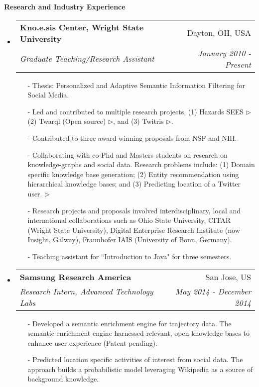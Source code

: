 \documentclass[letterpaper,9pt]{article}
\makeatletter
\newcommand{\resheading}[1]{{\large \colorbox{mygrey}{\begin{minipage}{\textwidth}{\textbf{#1 \vphantom{p\^{E}}}}\end{minipage}}}}
\newcommand{\ressubheading}[4]{
\begin{tabular*}{7.0in}{l@{\extracolsep{\fill}}r}
		\textbf{#1} & #2 \\
		\textit{#3} & \textit{#4} \\
\end{tabular*}\vspace{-6pt}}
\makeatother
\begin{document}
\resheading{Research and Industry Experience}
\begin{itemize}
\item
	\ressubheading{Kno.e.sis Center, Wright State University}{Dayton, OH, USA}{Graduate Teaching/Research Assistant}{January 2010 - Present}

\begin{itemize}

\item[-] Thesis: Personalized and Adaptive Semantic Information Filtering for Social Media. 
	
\item[-] Led and contributed to multiple research projects, (1) Hazards SEES \href{http://wiki.knoesis.org/index.php/Social_and_Physical_Sensing_
Enabled_Decision_Support}{$\triangleright$} (2) Twarql (Open source) \href{http://wiki.knoesis.org/index.php/Twarql}{$\triangleright$}, and (3) Twitris \href{http://twitris.knoesis.org}{$\triangleright$}. 

\item[-] \justify Contributed to three award winning proposals from NSF and NIH.

\item[-] \justify Collaborating with co-Phd and Masters students on research on  knowledge-graphs and social data. Research problems include: (1) Domain specific knowledge base generation; (2) Entity recommendation using hierarchical knowledge bases; and (3) Predicting location of a Twitter user.  \href{http://knoesis.org/library/resource.php?id=2039}{$\triangleright$}  

\item[-] \justify Research projects and proposals involved interdisciplinary, local and international collaborations such as Ohio State University, CITAR (Wright State University), Digital Enterprise Research Institute (now Insight, Galway), Fraunhofer IAIS (University of Bonn, Germany). 
	
\item[-] Teaching assistant for ``Introduction to Java" for three semesters. 

\end{itemize}

\item
\ressubheading{Samsung Research America}{San Jose, US}{Research Intern, Advanced Technology Labs}{May 2014 - December 2014}
\begin{itemize}
\item[-] Developed a semantic enrichment engine for trajectory data. The semantic enrichment engine harnessed relevant, open knowledge bases to enhance user experience (Patent pending). 
\item[-] Predicted location specific activities of interest from social data. The approach builds a probabilistic model leveraging Wikipedia as a source of background knowledge.    
\end{itemize}


\end{itemize}
\end{document}
